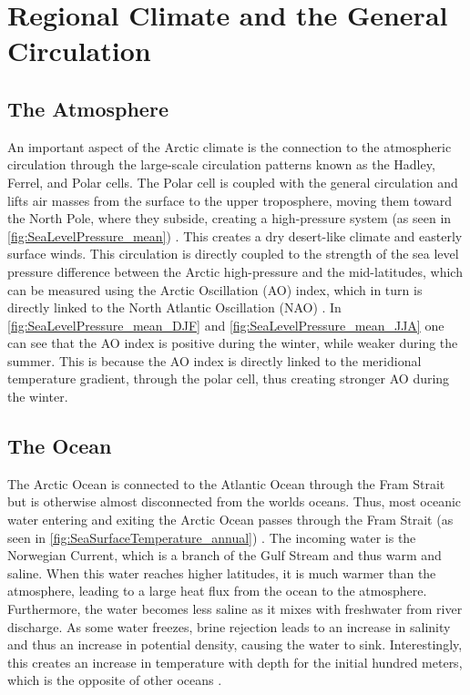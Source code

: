 \section{Regional Climate and the General Circulation}
\subsection{The Atmosphere}
An important aspect of the Arctic climate is the connection to the atmospheric circulation through the large-scale circulation patterns known as the Hadley, Ferrel, and Polar cells. The Polar cell is coupled with the general circulation and lifts air masses from the surface to the upper troposphere, moving them toward the North Pole, where they subside, creating a high-pressure system (as seen in \autoref{fig:SeaLevelPressure_mean}) \citep{hartmann2016}. This creates a dry desert-like climate and easterly surface winds. This circulation is directly coupled to the strength of the sea level pressure difference between the Arctic high-pressure and the mid-latitudes, which can be measured using the Arctic Oscillation (AO) index, which in turn is directly linked to the North Atlantic Oscillation (NAO) \citep{serreze2014}. In \autoref{fig:SeaLevelPressure_mean_DJF} and \autoref{fig:SeaLevelPressure_mean_JJA} one can see that the AO index is positive during the winter, while weaker during the summer. This is because the AO index is directly linked to the meridional temperature gradient, through the polar cell, thus creating stronger AO during the winter. 

\subsection{The Ocean}
The Arctic Ocean is connected to the Atlantic Ocean through the Fram Strait but is otherwise almost disconnected from the worlds oceans. Thus, most oceanic water entering and exiting the Arctic Ocean passes through the Fram Strait (as seen in \autoref{fig:SeaSurfaceTemperature_annual}) \citep{serreze2014}. The incoming water is the Norwegian Current, which is a branch of the Gulf Stream and thus warm and saline. When this water reaches higher latitudes, it is much warmer than the atmosphere, leading to a large heat flux from the ocean to the atmosphere. Furthermore, the water becomes less saline as it mixes with freshwater from river discharge. As some water freezes, brine rejection leads to an increase in salinity and thus an increase in potential density, causing the water to sink. Interestingly, this creates an increase in temperature with depth for the initial hundred meters, which is the opposite of other oceans \citep{serreze2014}.

